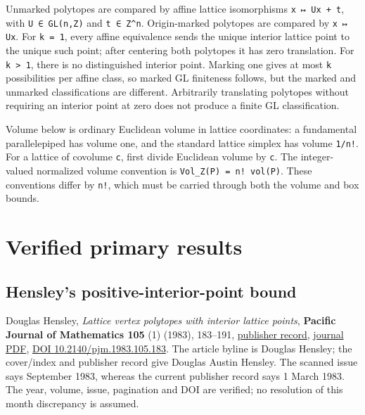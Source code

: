 \documentclass[11pt,a4paper,oneside]{report}
\begin{document}
Unmarked polytopes are compared by affine lattice isomorphisms
\texttt{x ↦ Ux + t}, with \texttt{U ∈ GL(\allowbreak{}n,\allowbreak{}Z)}
and \texttt{t ∈ Z\textasciicircum{}n}. Origin-marked polytopes are
compared by \texttt{x ↦ Ux}. For \texttt{k =\allowbreak{} 1}, every
affine equivalence sends the unique interior lattice point to the unique
such point; after centering both polytopes it has zero translation. For
\texttt{k > 1}, there is no distinguished interior point. Marking one
gives at most \texttt{k} possibilities per affine class, so marked GL
finiteness follows, but the marked and unmarked classifications are
different. Arbitrarily translating polytopes without requiring an
interior point at zero does not produce a finite GL classification.

Volume below is ordinary Euclidean volume in lattice coordinates: a
fundamental parallelepiped has volume one, and the standard lattice
simplex has volume \texttt{1/\allowbreak{}n!}. For a lattice of covolume
\texttt{c}, first divide Euclidean volume by \texttt{c}. The
integer-valued normalized volume convention is
\texttt{Vol\_\allowbreak{}Z(\allowbreak{}P)\allowbreak{} =\allowbreak{} n! vol(\allowbreak{}P)}.
These conventions differ by \texttt{n!}, which must be carried through
both the volume and box bounds.

\section{Verified primary
results}\label{finiteness-and-box-reduction--verified-primary-results}

\subsection{Hensley's positive-interior-point
bound}\label{finiteness-and-box-reduction--hensleys-positive-interior-point-bound}

Douglas Hensley, \emph{Lattice vertex polytopes with interior lattice
points}, \textbf{Pacific Journal of Mathematics 105} (1) (1983),
183--191, \href{https://msp.org/pjm/1983/105-1/p10.xhtml}{publisher
record},
\href{https://msp.org/pjm/1983/105-1/pjm-v105-n1-p10-s.pdf}{journal
PDF}, \href{https://doi.org/10.2140/pjm.1983.105.183}{DOI
10.\allowbreak{}2140/\allowbreak{}pjm.\allowbreak{}1983.\allowbreak{}105.\allowbreak{}183}.
The article byline is Douglas Hensley; the cover/index and publisher
record give Douglas Austin Hensley. The scanned issue says September
1983, whereas the current publisher record says 1 March 1983. The year,
volume, issue, pagination and DOI are verified; no resolution of this
month discrepancy is assumed.
\end{document}
